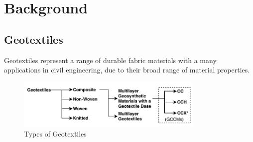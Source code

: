 \documentclass[12pt]{report}
\newcommand{\tcr}[1]{\textcolor{darkRed}{#1}}
\newcommand{\tcb}[1]{\textcolor{darkBlue}{#1}}
\begin{document}
        
        
\pagebreak
\chapter{Background}
    
    
    
\section{Geotextiles}

Geotextiles represent a range of durable fabric materials with a many applications in civil engineering, due to their broad range of material properties. 

\begin{figure}
    \centering
    \includegraphics[width=0.8\textwidth]{figures/background/geotextiles_tree.pdf}
    \caption{Types of Geotextiles}
    \label{fig:geotextiles_tree}
\end{figure}

    
\end{document}
